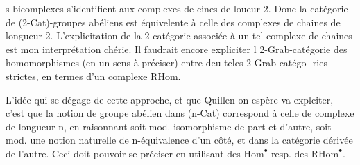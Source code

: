 s bicomplexes s'identifient aux complexes de cines de loueur 2.\linebreak
Donc la catégorie de (2-Cat)-groupes abéliens est équivelente à celle des\linebreak
complexes de chaines de longueur 2. L'explicitation de la 2-catégorie\linebreak
associée à un tel complexe de chaines est mon interprétation chérie. Il\linebreak
faudrait encore expliciter l 2-Grab-catégorie des\linebreak
homomorphismes (en un sens à préciser) entre deu teles 2-Grab-catégo-\linebreak
ries strictes, en termes d'un complexe $\mathrm{RHom}$.

L'idée qui se dégage de cette approche, et que Quillen on espère va\linebreak
explciter, c'est que la  notion de groupe abélien\linebreak
dans (n-Cat) correspond à celle de complexe de  longueur n, en raisonnant\linebreak
soit mod. isomorphisme de part et d'autre, soit mod. une notion naturelle\linebreak
de n-équivalence d'un côté, et dans la catégorie dérivée de l'autre. Ceci\linebreak
doit pouvoir se préciser en utilisant des $\mathrm{Hom}^{\bullet}$ resp. des $\mathrm{RHom}^{\bullet}$.

